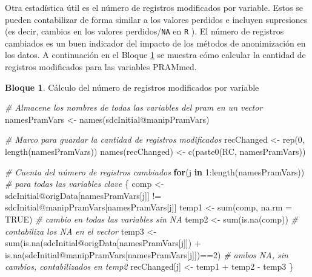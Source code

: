 \documentclass[
]{book}
\newenvironment{Shaded}{\begin{snugshade}}{\end{snugshade}}
\newcommand{\AttributeTok}[1]{\textcolor[rgb]{0.77,0.63,0.00}{#1}}
\newcommand{\CommentTok}[1]{\textcolor[rgb]{0.56,0.35,0.01}{\textit{#1}}}
\newcommand{\ConstantTok}[1]{\textcolor[rgb]{0.00,0.00,0.00}{#1}}
\newcommand{\ControlFlowTok}[1]{\textcolor[rgb]{0.13,0.29,0.53}{\textbf{#1}}}
\newcommand{\DecValTok}[1]{\textcolor[rgb]{0.00,0.00,0.81}{#1}}
\newcommand{\FunctionTok}[1]{\textcolor[rgb]{0.00,0.00,0.00}{#1}}
\newcommand{\NormalTok}[1]{#1}
\newcommand{\OtherTok}[1]{\textcolor[rgb]{0.56,0.35,0.01}{#1}}
\newcommand{\SpecialCharTok}[1]{\textcolor[rgb]{0.00,0.00,0.00}{#1}}
\newcommand{\StringTok}[1]{\textcolor[rgb]{0.31,0.60,0.02}{#1}}
\theoremstyle{definition}
\theoremstyle{definition}
\newtheorem{example}{Bloque}[chapter]
\theoremstyle{definition}
\theoremstyle{definition}
\theoremstyle{remark}
\begin{document}
Otra estadística útil es el número de registros modificados por variable. Estos se pueden contabilizar de forma similar a los valores perdidos e incluyen supresiones (es decir, cambios en los valores perdidos/\texttt{NA} en \texttt{R} ). El número de registros cambiados es un buen indicador del impacto de los métodos de anonimización en los datos. A
continuación en el Bloque \ref{exm:bloque3lbn} se muestra cómo calcular la cantidad de registros modificados para las variables PRAMmed.

\begin{example}
\protect\hypertarget{exm:bloque3lbn}{}\label{exm:bloque3lbn}Cálculo del número de registros modificados por variable
\end{example}

\begin{Shaded}
\begin{Highlighting}[]
\CommentTok{\# Almacene los nombres de todas las variables del pram en un vector}
\NormalTok{namesPramVars }\OtherTok{\textless{}{-}} \FunctionTok{names}\NormalTok{(sdcInitial}\SpecialCharTok{@}\NormalTok{manipPramVars)}

\CommentTok{\# Marco para guardar la cantidad de registros modificados}
\NormalTok{recChanged }\OtherTok{\textless{}{-}} \FunctionTok{rep}\NormalTok{(}\DecValTok{0}\NormalTok{, }\FunctionTok{length}\NormalTok{(namesPramVars))}
\FunctionTok{names}\NormalTok{(recChanged) }\OtherTok{\textless{}{-}} \FunctionTok{c}\NormalTok{(}\FunctionTok{paste0}\NormalTok{(}\StringTok{\textquotesingle{}RC\textquotesingle{}}\NormalTok{, namesPramVars))}

\CommentTok{\# Cuenta del número de registros cambiados}
\ControlFlowTok{for}\NormalTok{(j }\ControlFlowTok{in} \DecValTok{1}\SpecialCharTok{:}\FunctionTok{length}\NormalTok{(namesPramVars)) }\CommentTok{\# para todas las  variables clave}
\NormalTok{\{}
\NormalTok{  comp }\OtherTok{\textless{}{-}}\NormalTok{ sdcInitial}\SpecialCharTok{@}\NormalTok{origData[namesPramVars[j]] }\SpecialCharTok{!=}
\NormalTok{                              sdcInitial}\SpecialCharTok{@}\NormalTok{manipPramVars[namesPramVars[j]]}
\NormalTok{  temp1 }\OtherTok{\textless{}{-}} \FunctionTok{sum}\NormalTok{(comp, }\AttributeTok{na.rm =} \ConstantTok{TRUE}\NormalTok{) }\CommentTok{\# cambio en todas las variables sin NA}
\NormalTok{  temp2 }\OtherTok{\textless{}{-}} \FunctionTok{sum}\NormalTok{(}\FunctionTok{is.na}\NormalTok{(comp))        }\CommentTok{\# contabiliza los NA en el vector}
\NormalTok{  temp3 }\OtherTok{\textless{}{-}} \FunctionTok{sum}\NormalTok{(}\FunctionTok{is.na}\NormalTok{(sdcInitial}\SpecialCharTok{@}\NormalTok{origData[namesPramVars[j]])}
               \SpecialCharTok{+} \FunctionTok{is.na}\NormalTok{(sdcInitial}\SpecialCharTok{@}\NormalTok{manipPramVars[namesPramVars[j]])}\SpecialCharTok{==}\DecValTok{2}\NormalTok{)}
  \CommentTok{\# ambos NA, sin cambios, contabilizados en temp2}
\NormalTok{  recChanged[j] }\OtherTok{\textless{}{-}}\NormalTok{ temp1 }\SpecialCharTok{+}\NormalTok{ temp2 }\SpecialCharTok{{-}}\NormalTok{ temp3}
\NormalTok{\}}


\end{Highlighting}
\end{Shaded}
\end{document}

